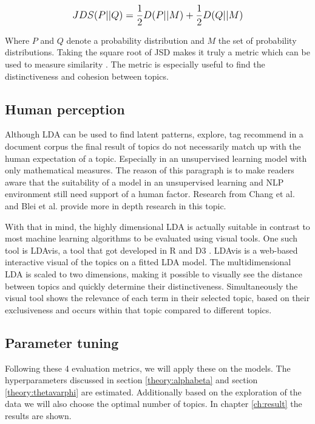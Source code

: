 \[
\mathlarger{JDS(P||Q) = \frac{1}{2}D(P||M) + \frac{1}{2}D(Q||M)}
\]

Where $P$ and $Q$ denote a probability distribution and $M$ the set of probability distributions. Taking the square root of JSD makes it truly a metric which can be used to measure similarity \cite{Huang2008}. The metric is especially useful to find the distinctiveness and cohesion between topics.

\subsection{Human perception}\label{methodology:humanperception}
Although LDA can be used to find latent patterns, explore, tag recommend in a document corpus the final result of topics do not necessarily match up with the human expectation of a topic. Especially in an unsupervised learning model with only mathematical measures\cite{Towne2016MeasuringPerception}. The reason of this paragraph is to make readers aware that the suitability of a model in an unsupervised learning and NLP environment still need support of a human factor. Research from Chang  et al. \cite{Chang2009} and Blei et al. \cite{Chaney2012VisualizingModels.} provide more in depth research in this topic.  

With that in mind, the highly dimensional LDA is actually suitable in contrast to most machine learning algorithms to be evaluated using visual tools. One such tool is LDAvis, a tool that got developed in R and D3 \cite{Sievert2014}. LDAvis is a web-based interactive visual of the topics on a fitted LDA model. The multidimensional LDA is scaled to two dimensions, making it possible to visually see the distance between topics and quickly determine their distinctiveness. Simultaneously the visual tool shows the relevance of each term in their selected topic, based on their exclusiveness and occurs within that topic compared to different topics.

\subsection{Parameter tuning}\label{methodology:parameter tuning}

Following these 4 evaluation metrics, we will apply these on the models. The hyperparameters discussed in section \ref{theory:alphabeta} and section \ref{theory:thetavarphi} are estimated. Additionally based on the exploration of the data we will also choose the optimal number of topics. In chapter \ref{ch:result} the results are shown. 